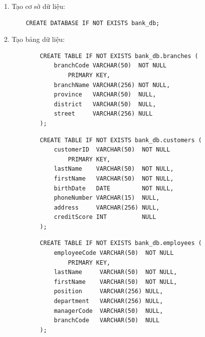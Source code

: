 \begin{enumerate}[label=\alph*.]

    \item Tạo cơ sở dữ liệu:
    
    \begin{lstlisting}
    CREATE DATABASE IF NOT EXISTS bank_db;
    \end{lstlisting}

    \item Tạo bảng dữ liệu:
    
    \begin{enumerate}[label=\arabic*.]
    
        
        \begin{lstlisting}
        CREATE TABLE IF NOT EXISTS bank_db.branches (
            branchCode VARCHAR(50)  NOT NULL 
                PRIMARY KEY,
            branchName VARCHAR(256) NOT NULL,
            province   VARCHAR(50)  NULL,
            district   VARCHAR(50)  NULL,
            street     VARCHAR(256) NULL
        );
        \end{lstlisting}

        
        \begin{lstlisting}
        CREATE TABLE IF NOT EXISTS bank_db.customers (
            customerID  VARCHAR(50)  NOT NULL 
                PRIMARY KEY,
            lastName    VARCHAR(50)  NOT NULL,
            firstName   VARCHAR(50)  NOT NULL,
            birthDate   DATE         NOT NULL,
            phoneNumber VARCHAR(15)  NULL,
            address     VARCHAR(256) NULL,
            creditScore INT          NULL
        );
        \end{lstlisting}

        
        \begin{lstlisting}
        CREATE TABLE IF NOT EXISTS bank_db.employees (
            employeeCode VARCHAR(50)  NOT NULL 
                PRIMARY KEY,
            lastName     VARCHAR(50)  NOT NULL,
            firstName    VARCHAR(50)  NOT NULL,
            position     VARCHAR(256) NULL,
            department   VARCHAR(256) NULL,
            managerCode  VARCHAR(50)  NULL,
            branchCode   VARCHAR(50)  NULL
        );
        \end{lstlisting}


\end{enumerate}
\end{enumerate}
